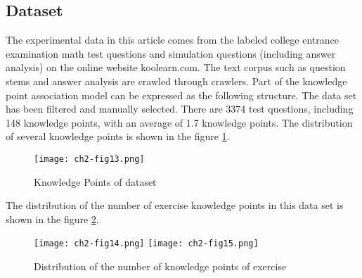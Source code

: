 \subsection{Dataset}
The experimental data in this article comes from the labeled college entrance examination math test questions and simulation questions (including answer analysis) on the online website koolearn.com. The text corpus such as question stems and answer analysis are crawled through crawlers. Part of the knowledge point association model can be expressed as the following structure. The data set has been filtered and manually selected. There are 3374 test questions, including 148 knowledge points, with an average of 1.7 knowledge points. The distribution of several knowledge points is shown in the figure \ref{ch2-fig13}.
\begin{figure}[H]
	\centering
	\texttt{[image: ch2-fig13.png]}
	\caption{Knowledge Points of dataset}
	\label{ch2-fig13}
\end{figure}

The distribution of the number of exercise knowledge points in this data set is shown in the figure \ref{ch2-fig14}.
\begin{figure}[H]
	\centering
	\texttt{[image: ch2-fig14.png]}
	\texttt{[image: ch2-fig15.png]}
	\caption{Distribution of the number of knowledge points of exercise}
	\label{ch2-fig14}
\end{figure}




